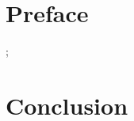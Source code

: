 
	







\section*{Preface}

\newpage

\tableofcontents

\listoffigures





;


\section{Conclusion}

